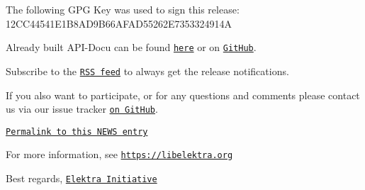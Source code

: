The following G\+PG Key was used to sign this release\+: 12\+C\+C44541\+E1\+B8\+A\+D9\+B66\+A\+F\+A\+D55262\+E7353324914A

Already built A\+P\+I-\/\+Docu can be found \href{https://doc.libelektra.org/api/0.9.<<VERSION>>/html/}{\tt here} or on \href{https://github.com/ElektraInitiative/doc/tree/master/api/0.9.<<VERSION>}{\tt Git\+Hub}.

Subscribe to the \href{https://www.libelektra.org/news/feed.rss}{\tt R\+SS feed} to always get the release notifications.

If you also want to participate, or for any questions and comments please contact us via our issue tracker \href{http://issues.libelektra.org}{\tt on Git\+Hub}.

\href{https://www.libelektra.org/news/0.9.<<VERSION>>-release}{\tt Permalink to this N\+E\+WS entry}

For more information, see \href{https://libelektra.org}{\tt https\+://libelektra.\+org}

Best regards, \href{https://www.libelektra.org/developers/authors}{\tt Elektra Initiative} 